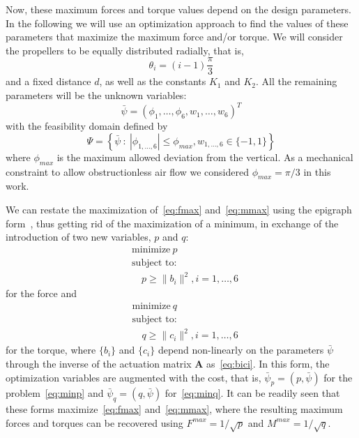 Now, these maximum forces and torque values depend on the design
parameters. In the following we will use an optimization approach to
find the values of these parameters that maximize the maximum force
and/or torque. We will consider the propellers to be equally
distributed radially, that is,
\begin{equation}
  \label{eq:thetas}
  \theta_i = (i-1) \frac{\pi}{3}
\end{equation}
and a fixed distance $d$, as well as the constants $K_1$ and $K_2$. All the
remaining parameters will be the unknown variables:
\begin{equation}
  \bar{\psi} = ( \phi_1, \ldots, \phi_6, w_1,\ldots, w_6 )^T
\end{equation}
with the feasibility domain defined by
\begin{equation}
  \Psi = \left\{ \bar{\psi} \::\: |\phi_{1,\ldots,6}| \leq
  \phi_{max}, w_{1,\ldots,6}\in\{-1,1\} \right\}
\end{equation}
where $\phi_{max}$ is the maximum allowed deviation from the
vertical. As a mechanical constraint to allow obstructionless air flow
we considered $\phi_{max}=\pi/3$ in this work.

We can restate the maximization of~\eqref{eq:fmax}
and~\eqref{eq:mmax} using the epigraph form~\cite{boyd04}, thus getting rid of the
maximization of a minimum, in exchange of the introduction of two new
variables, $p$ and $q$:
\begin{equation}
  \label{eq:minp}
  \begin{split}
    &\text{minimize}\: p \\
    &\text{subject to:} \\
    &\quad p \geq \|b_i\|^2, i=1,\ldots,6
  \end{split}
\end{equation}
for the force and
\begin{equation}
  \label{eq:minq}
  \begin{split}
    &\text{minimize}\: q \\
    &\text{subject to:} \\
    &\quad q \geq \|c_i\|^2, i=1,\ldots,6
  \end{split}
\end{equation}
for the torque, where $\{b_i\}$ and $\{c_i\}$ depend non-linearly on
the parameters $\bar{\psi}$ through the inverse of the actuation
matrix $\mathbf{A}$ as~\eqref{eq:bici}. In this form, the optimization
variables are augmented with the cost, that is,
$\bar{\psi}_p=(p, \bar{\psi})$ for the problem~\eqref{eq:minp} and
$\bar{\psi}_q=(q, \bar{\psi})$ for~\eqref{eq:minq}.  It can be readily
seen that these forms maximize~\eqref{eq:fmax} and~\eqref{eq:mmax},
where the resulting maximum forces and torques can be recovered using
$F^{max}=1/\sqrt{p}$ and $M^{max}=1/\sqrt{q}$.

